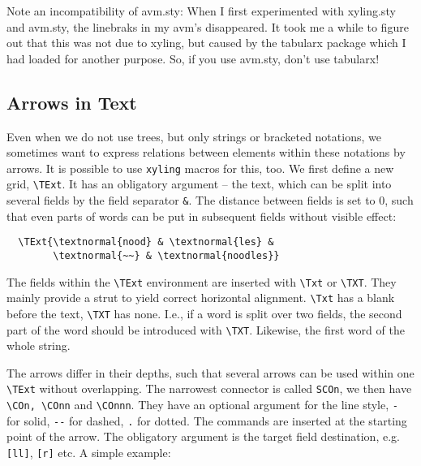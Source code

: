 \documentclass[12pt,a4paper]{article}
\begin{document}
Note an incompatibility of avm.sty: When I first experimented with xyling.sty and
avm.sty, the linebraks in my avm's disappeared. It took me a while to figure out that
this was not due to xyling, but caused by the tabularx package which I had loaded for
another purpose. So, if you use avm.sty, don't use tabularx!

\subsection{Arrows in Text}
\label{sec:text}

Even when we do not use trees, but only strings or bracketed notations, we
sometimes want to express relations between elements within these notations by
arrows. It is possible to use \texttt{xyling} macros for this, too. We first
define a new grid, \verb|\TExt|. It has an obligatory argument -- the text,
which can be split into several fields by the field separator \verb|&|. The
distance between fields is set to 0, such that even parts of words can be put in
subsequent fields without visible effect:

\begin{minipage}[t]{3cm}
\end{minipage}
\begin{minipage}[t]{8cm}
\begin{verbatim}
  \TExt{\textnormal{nood} & \textnormal{les} &
        \textnormal{~~} & \textnormal{noodles}}\end{verbatim}
\end{minipage}

The fields within the \verb|\TExt| environment are inserted with \verb|\Txt| or
\verb|\TXT|. They mainly provide a strut to yield correct horizontal alignment.
\verb|\Txt| has a blank before the text, \verb|\TXT| has none. I.e., if a word
is split over two fields, the second part of the word should be introduced with
\verb|\TXT|.  Likewise, the first word of the whole string.

The arrows differ in their depths, such that several arrows can be used within
one \verb|\TExt| without overlapping. The narrowest connector is called
\verb|SCOn|, we then have \verb|\COn, \COnn| and \verb|\COnnn|. They have an
optional argument for the line style, \verb|-| for solid, \verb|--| for dashed,
\verb|.| for dotted. The commands are inserted at the starting point of the
arrow. The obligatory argument is the target field destination, e.g.
\texttt{[ll]}, \texttt{[r]} etc. A simple example:
\end{document}
